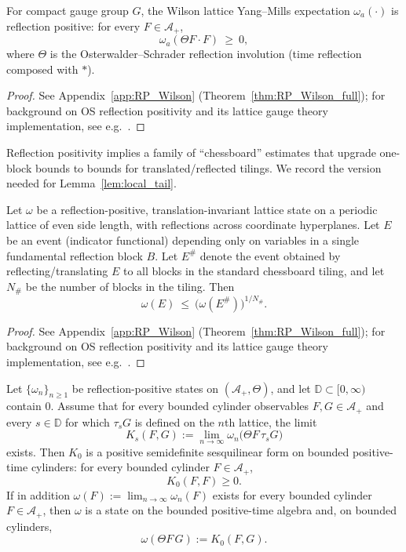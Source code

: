 \begin{theorem}\label{thm:RP_Wilson}
For compact gauge group $G$, the Wilson lattice Yang--Mills expectation $\omega_a(\cdot)$ is reflection positive:
for every $F\in\mathcal A_+$,
\[
\omega_a(\Theta F\cdot F)\ \ge\ 0,
\]
where $\Theta$ is the Osterwalder--Schrader reflection involution (time reflection composed with $\ast$).
\end{theorem}

\begin{proof}
See Appendix~\ref{app:RP_Wilson} (Theorem~\ref{thm:RP_Wilson_full}); for background on OS reflection positivity and its lattice gauge theory implementation, see e.g.\ \cite{OS1,OS2,OSSeiler1978}.
\end{proof}

Reflection positivity implies a family of ``chessboard'' estimates that upgrade one-block bounds to bounds for translated/reflected tilings.
We record the version needed for Lemma~\ref{lem:local_tail}.

\begin{lemma}\label{lem:chessboard}
Let $\omega$ be a reflection-positive, translation-invariant lattice state on a periodic lattice of even side length, with reflections across coordinate hyperplanes.
Let $E$ be an event (indicator functional) depending only on variables in a single fundamental reflection block $B$.
Let $E^{\#}$ denote the event obtained by reflecting/translating $E$ to all blocks in the standard chessboard tiling, and let $N_\#$ be the number of blocks in the tiling.
Then
\begin{equation}\label{eq:chessboard_general}
\omega(E)\ \le\ \big(\omega(E^{\#})\big)^{1/N_\#}.
\end{equation}
\end{lemma}

\begin{proof}
See Appendix~\ref{app:RP_Wilson} (Theorem~\ref{thm:RP_Wilson_full}); for background on OS reflection positivity and its lattice gauge theory implementation, see e.g.\ \cite{OS1,OS2,OSSeiler1978}.
\end{proof}

\begin{lemma}\label{lem:RP_limit}
Let $\{\omega_n\}_{n\ge 1}$ be reflection-positive states on $(\mathcal A_+,\Theta)$, and let $\mathbb D\subset[0,\infty)$ contain $0$.
Assume that for every bounded cylinder observables $F,G\in\mathcal A_+$ and every $s\in\mathbb D$ for which $\tau_s G$ is defined on the $n$th lattice, the limit
\[
K_s(F,G):=\lim_{n\to\infty}\omega_n\bigl(\Theta F\,\tau_s G\bigr)
\]
exists.
Then $K_0$ is a positive semidefinite sesquilinear form on bounded positive-time cylinders: for every bounded cylinder $F\in\mathcal A_+$,
\[
K_0(F,F)\ge 0.
\]
If in addition $\omega(F):=\lim_{n\to\infty}\omega_n(F)$ exists for every bounded cylinder $F\in\mathcal A_+$, then $\omega$ is a state on the bounded positive-time algebra and, on bounded cylinders,
\[
\omega(\Theta F\,G):=K_0(F,G).
\]
\end{lemma}

